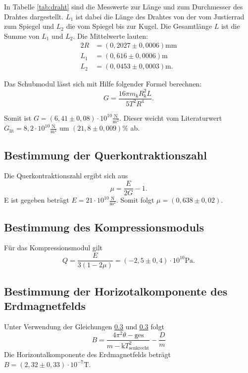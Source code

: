 In Tabelle \ref{tab:draht} sind die Messwerte zur Länge und zum Durchmesser des Drahtes dargestellt. $L_1$ ist dabei die Länge des Drahtes von der vom Justierrad zum Spiegel und $L_2$ die vom Spiegel bis zur Kugel. Die Gesamtlänge $L$ ist die Summe von $L_1$ und $L_2$.
Die Mittelwerte lauten:
\begin{align}
  2R&=(0,2027 \pm 0,0006)\si{\milli\meter} \\
  L_1&=(0,616 \pm 0,0006)\si{\meter} \\
  L_2&=(0,0453 \pm 0,0003) \si{\meter}.
\end{align}

Das Schubmodul lässt sich mit Hilfe folgender Formel berechnen:
\begin{equation}
  G = \frac{16\pi m_\mathrm{k} R_\mathrm{k}^2 L}{5T^2 R^4}.
\end{equation}

Somit ist $G=(6,41 \pm 0,08)\cdot 10^{10} \frac{\si{\newton}}{\si{\meter}^2}$.
Dieser weicht vom Literaturwert $G_\mathrm{lit} = 8,2 \cdot 10^{10}\frac{\si{\newton}}{\si{\meter}^2}$ um $(21,8 \pm 0,009)\%$ ab.

\subsection{Bestimmung der Querkontraktionszahl}
Die Querkontraktionszahl ergibt sich aus
\begin{equation}
  \mu = \frac{E}{2G}-1.
\end{equation}
E ist gegeben beträgt $E=21 \cdot 10^{10} \frac{\si{\newton}}{\si{\meter}^2}$.
Somit folgt $\mu = (0,638 \pm 0,02)$.

\subsection{Bestimmung des Kompressionsmoduls}
 Für das Kompressionsmodul gilt
 \begin{equation}
   Q = \frac{E}{3(1-2\mu)} = (-2,5 \pm 0,4)\cdot 10^{10} \si{\pascal}.
\end{equation}


\subsection{Bestimmung der Horizotalkomponente des Erdmagnetfelds}

Unter Verwendung der Gleichungen \ref{} und \ref{} folgt
\begin{equation}
  B = \frac{4\pi^2 \theta-\mathrm{ges}}{m-\mathrm{k}T_\mathrm{senkrecht}^2} - \frac{D}{m}
\end{equation}
Die Horizontalkomponente des Erdmagnetfelds beträgt $B=(2,32 \pm 0,33)\cdot 10^{-7}\si{\tesla}$.

